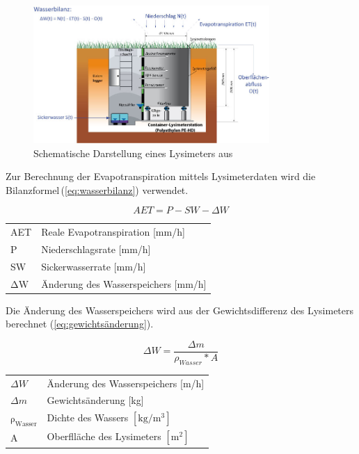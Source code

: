 \begin{figure}[H]
\centering
\includegraphics[width=0.8\textwidth]{figures/lysimeter_schema.jpg}
\caption{Schematische Darstellung eines Lysimeters aus \cite{ugt}}
\label{fig:lysimeter_schema}
\end{figure}


Zur Berechnung der Evapotranspiration mittels Lysimeterdaten wird die Bilanzformel\,(\ref{eq:wasserbilanz}) verwendet.


\begin{equation}
\label{eq:wasserbilanz}
AET=P-SW-\Delta W
\end{equation}
\begin{table}[H]
\centering
\begin{tabular}{ll}
AET& Reale Evapotranspiration [mm/h]\\
P& Niederschlagsrate [mm/h]\\
SW & Sickerwasserrate [mm/h]\\
$\mathrm{\Delta W}$ & Änderung des Wasserspeichers [mm/h]\\
\end{tabular}
\end{table}


Die Änderung des Wasserspeichers wird aus der Gewichtsdifferenz des Lysimeters berechnet (\ref{eq:gewichtsänderung}).


\begin{equation}
\label{eq:gewichtsänderung}
\Delta W=\frac{\Delta m}{\rho_{Wasser}* A}
\end{equation}
\begin{table}[H]
\centering
\begin{tabular}{ll}
$\Delta W$ & Änderung des Wasserspeichers [m/h]\\
$\Delta m$ & Gewichtsänderung [kg]\\
$\mathrm{\rho_{Wasser}}$ & Dichte des Wassers $\mathrm{[kg/m^3]}$\\
A & Oberflläche des Lysimeters $\mathrm{[m^2]}$
\end{tabular}
\end{table}

